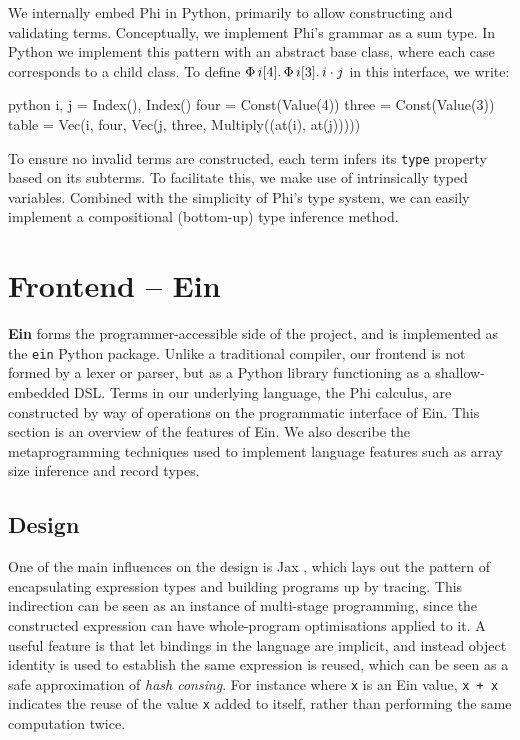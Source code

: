 We internally embed Phi in Python, primarily to allow constructing and validating terms. Conceptually, we implement Phi's grammar as a sum type. In Python we implement this pattern with an abstract base class, where each case corresponds to a child class. To define $\Phi\, {i}[{4}] \ldotp {\Phi\, {i}[{3}] \ldotp {i \cdot j}}$ in this interface, we write:
\begin{center}
\begin{cminted}{python}
i, j = Index(), Index()
four = Const(Value(4))
three = Const(Value(3))
table = Vec(i, four, Vec(j, three, Multiply((at(i), at(j)))))
\end{cminted}
\end{center}
To ensure no invalid terms are constructed, each term infers its \texttt{type} property based on its subterms. To facilitate this, we make use of intrinsically typed variables. Combined with the simplicity of Phi's type system, we can easily implement a compositional (bottom-up) type inference method.


\section{Frontend -- Ein}

\textbf{Ein} forms the programmer-accessible side of the project, and is implemented as the \texttt{ein} Python package. Unlike a traditional compiler, our frontend is not formed by a lexer or parser, but as a Python library functioning as a shallow-embedded DSL. Terms in our underlying language, the Phi calculus, are constructed by way of operations on the programmatic interface of Ein. This section is an overview of the features of Ein. We also describe the metaprogramming techniques used to implement language features such as array size inference and record types.

\subsection{Design}

One of the main influences on the design is Jax \cite{frostig2018compiling}, which lays out the pattern of encapsulating expression types and building programs up by tracing. This indirection can be seen as an instance of multi-stage programming, since the constructed expression can have whole-program optimisations applied to it. A useful feature is that let bindings in the language are implicit, and instead object identity is used to establish the same expression is reused, which can be seen as a safe approximation of \textit{hash consing}. For instance where \texttt{x} is an Ein value, \texttt{x + x} indicates the reuse of the value \texttt{x} added to itself, rather than performing the same computation twice.

